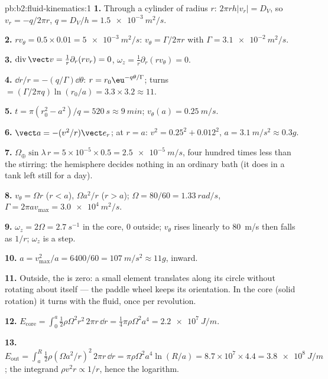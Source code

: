 \begin{solution}{pb:b2:fluid-kinematics:1}
\textbf{1.} Through a cylinder of radius $r$: $2\pi rh|v_r| = D_V$, so
$v_r = -q/2\pi r$, $q = D_V/h = \qty{1.5e-3}{m^2/s}$.

\textbf{2.} $rv_\theta = 0.5 \times 0.01 = \qty{5e-3}{m^2/s}$: $v_\theta = \Gamma/2\pi r$
with $\Gamma = \qty{3.1e-2}{m^2/s}$.

\textbf{3.} $\operatorname{div}\vect v = \frac1r\partial_r(rv_r) = 0$, $\omega_z =
\frac1r\partial_r(rv_\theta) = 0$.

\textbf{4.} $\dd r/r = -(q/\Gamma)\dd\theta$: $r = r_0\eu^{-q\theta/\Gamma}$; turns
$= (\Gamma/2\pi q)\ln(r_0/a) = 3.3 \times 3.2 \approx 11$.

\textbf{5.} $t = \pi(r_0^2 - a^2)/q = \qty{520}{s} \approx \qty{9}{min}$; $v_\theta(a) =
\qty{0.25}{m/s}$.

\textbf{6.} $\vect a = -(v^2/r)\vect e_r$; at $r = a$: $v^2 = 0.25^2 + 0.012^2$,
$a = \qty{3.1}{m/s^2} \approx 0.3g$.

\textbf{7.} $\Omega_\oplus\sin\lambda\,r = 5 \times 10^{-5} \times 0.5 = \qty{2.5e-5}{m/s}$,
four hundred times less than the stirring: the hemisphere decides
nothing in an ordinary bath (it does in a tank left still for a day).

\textbf{8.} $v_\theta = \Omega r$ ($r < a$), $\Omega a^2/r$ ($r > a$); $\Omega = 80/60
= \qty{1.33}{rad/s}$, $\Gamma = 2\pi av_{\max} = \qty{3.0e4}{m^2/s}$.

\textbf{9.} $\omega_z = 2\Omega = \qty{2.7}{s^{-1}}$ in the core, $0$ outside;
$v_\theta$ rises linearly to \qty{80}{m/s} then falls as $1/r$; $\omega_z$ is a
step.

\textbf{10.} $a = v_{\max}^2/a = 6400/60 = \qty{107}{m/s^2} \approx 11g$, inward.

\textbf{11.} Outside, the  is zero: a small element translates
along its circle without rotating about itself --- the paddle wheel
keeps its orientation. In the core (solid rotation) it turns with the
fluid, once per revolution.

\textbf{12.} $E_{\text{core}} = \int_0^a\tfrac12\rho\Omega^2r^2\,2\pi r\,\dd r =
\tfrac14\pi\rho\Omega^2a^4 = \qty{2.2e7}{J/m}$.

\textbf{13.} $E_{\text{out}} = \int_a^R\tfrac12\rho(\Omega a^2/r)^2\,2\pi r\,\dd r =
\pi\rho\Omega^2a^4\ln(R/a) = 8.7 \times 10^7 \times 4.4 = \qty{3.8e8}{J/m}$; the
integrand $\rho v^2r \propto 1/r$, hence the logarithm.


\end{solution}
